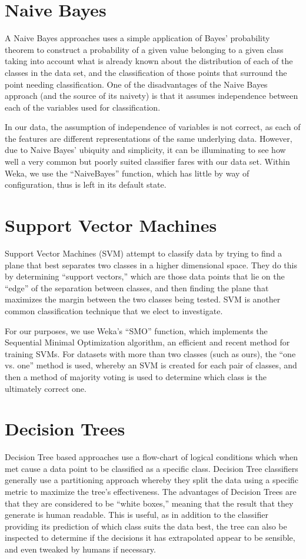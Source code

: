 \section{Naive Bayes}
A Naive Bayes approaches uses a simple application of Bayes' probability theorem to construct a probability of a given value belonging to a given class taking into account what is already known about the distribution of each of the classes in the data set, and the classification of those points that surround the point needing classification. One of the disadvantages of the Naive Bayes approach (and the source of its naivety) is that it assumes independence between each of the variables used for classification.

In our data, the assumption of independence of variables is not correct, as each of the features are different representations of the same underlying data. However, due to Naive Bayes' ubiquity and simplicity, it can be illuminating to see how well a very common but poorly suited classifier fares with our data set. Within Weka, we use the ``NaiveBayes'' function, which has little by way of configuration, thus is left in its default state.

\section{Support Vector Machines}
Support Vector Machines (SVM) attempt to classify data by trying to find a plane that best separates two classes in a higher dimensional space. They do this by determining ``support vectors,'' which are those data points that lie on the ``edge'' of the separation between classes, and then finding the plane that maximizes the margin between the two classes being tested. SVM is another common classification technique that we elect to investigate.

For our purposes, we use Weka's ``SMO'' function, which implements the Sequential Minimal Optimization algorithm, an efficient and recent method for training SVMs. For datasets with more than two classes (such as ours), the ``one vs. one'' method is used, whereby an SVM is created for each pair of classes, and then a method of majority voting is used to determine which class is the ultimately correct one.

\section{Decision Trees}
Decision Tree based approaches use a flow-chart of logical conditions which when met cause a data point to be classified as a specific class. Decision Tree classifiers generally use a partitioning approach whereby they split the data using a specific metric to maximize the tree's effectiveness. The advantages of Decision Trees are that they are considered to be ``white boxes,'' meaning that the result that they generate is human readable. This is useful, as in addition to the classifier providing its prediction of which class suits the data best, the tree can also be inspected to determine if the decisions it has extrapolated appear to be sensible, and even tweaked by humans if necessary.

